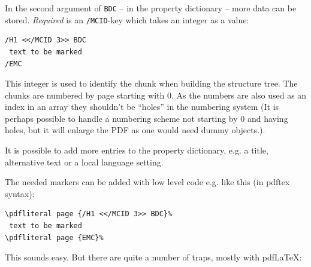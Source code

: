 \documentclass[DIV=12,parskip=half-,bibliography=totoc]{scrartcl}
\newcommand\PDF{PDF}
\begin{document}
\begin{description}
In the second argument of \texttt{BDC} -- in the property dictionary -- more data can be stored. \emph{Required} is an \texttt{/MCID}-key which takes an integer as a value:


\begin{lstlisting}
/H1 <</MCID 3>> BDC
 text to be marked
/EMC
\end{lstlisting}


This integer is used to identify the chunk when building the structure tree. The chunks are numbered by page starting with 0. As the numbers are also used as an index in an array they shouldn't be \enquote{holes} in the numbering system
(It is perhaps possible to handle a numbering scheme not starting by 0 and having holes, but it will enlarge the \PDF{} as one would need dummy objects.).

It is possible to add more entries to the property dictionary, e.g. a title, alternative text or a local language setting.
\end{description}


The needed markers can be added with low level code e.g. like this (in pdftex syntax):


\begin{lstlisting}
\pdfliteral page {/H1 <</MCID 3>> BDC}%
 text to be marked
\pdfliteral page {EMC}%
\end{lstlisting}


This sounds easy. But there are quite a number of traps, mostly with pdfLaTeX:
\end{document}
